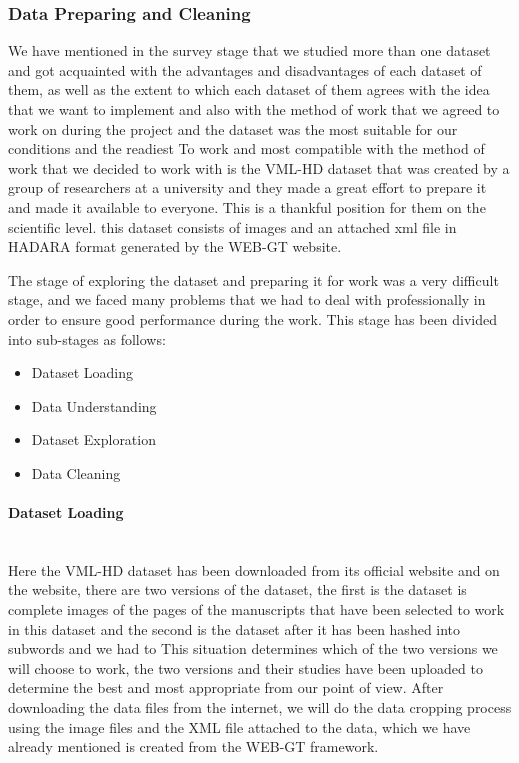 \subsubsection{Data Preparing and Cleaning}

We have mentioned in the survey stage that we studied more than one dataset and got acquainted with the advantages and disadvantages of each dataset of them, as well as the extent to which each dataset of them agrees with the idea that we want to implement and also with the method of work that we agreed to work on during the project and the dataset was the most suitable for our conditions and the readiest To work and most compatible with the method of work that we decided to work with is the VML-HD dataset that was created by a group of researchers at a university and they made a great effort to prepare it and made it available to everyone. This is a thankful position for them on the scientific level. this dataset consists of images and an attached xml file in HADARA format generated by the WEB-GT website.

The stage of exploring the dataset and preparing it for work was a very difficult stage, and we faced many problems that we had to deal with professionally in order to ensure good performance during the work.
This stage has been divided into sub-stages as follows:
\begin{itemize}
  \itemsep0em
  \item Dataset Loading
  \item Data Understanding
  \item Dataset Exploration
  \item Data Cleaning
\end{itemize}

\paragraph{Dataset Loading}\mbox{}\\
Here the VML-HD dataset has been downloaded from its official website and on the website, there are two versions of the dataset, the first is the dataset is complete images of the pages of the manuscripts that have been selected to work in this dataset and the second is the dataset after it has been hashed into subwords and we had to This situation determines which of the two versions we will choose to work, the two versions and their studies have been uploaded to determine the best and most appropriate from our point of view.
After downloading the data files from the internet, we will do the data cropping process using the image files and the XML file attached to the data, which we have already mentioned is created from the WEB-GT framework.

